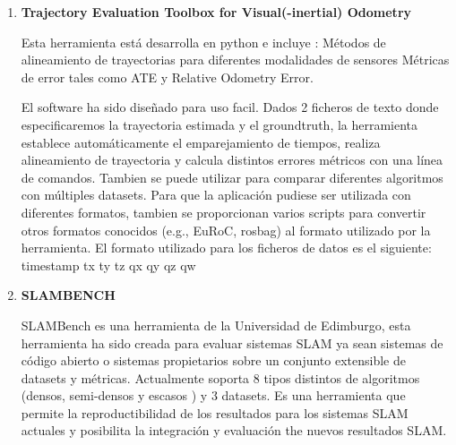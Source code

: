 \begin {enumerate}


\item \textbf{Trajectory Evaluation Toolbox for Visual(-inertial) Odometry}

Esta herramienta está desarrolla en python e incluye : 
Métodos de alineamiento de trayectorias para diferentes modalidades de sensores
Métricas de error tales como ATE y Relative Odometry Error. \cite{Zhang18iros}

El software ha sido diseñado para uso facil. Dados 2 ficheros de texto donde especificaremos la trayectoria estimada y el groundtruth, la herramienta establece automáticamente el emparejamiento de tiempos, realiza alineamiento de trayectoria y calcula distintos errores métricos con una línea de comandos. Tambien se puede utilizar para comparar diferentes algoritmos con múltiples datasets. Para que la aplicación pudiese ser utilizada con diferentes formatos, tambien se proporcionan varios scripts para convertir otros formatos conocidos (e.g., EuRoC, rosbag) al formato utilizado por la herramienta.
El formato utilizado para los ficheros de datos es el siguiente: timestamp tx ty tz qx qy qz qw

\item \textbf{SLAMBENCH}

SLAMBench es una herramienta de la Universidad de Edimburgo, esta herramienta ha sido creada para evaluar sistemas SLAM ya sean sistemas de código abierto o sistemas propietarios sobre un conjunto extensible de datasets y métricas. \cite{Bodin2018}
Actualmente soporta 8 tipos distintos de algoritmos (densos, semi-densos y escasos ) y 3 datasets. Es una herramienta que permite la reproductibilidad de los resultados para los sistemas SLAM actuales y posibilita la integración y evaluación the nuevos resultados SLAM.


\end{enumerate}
